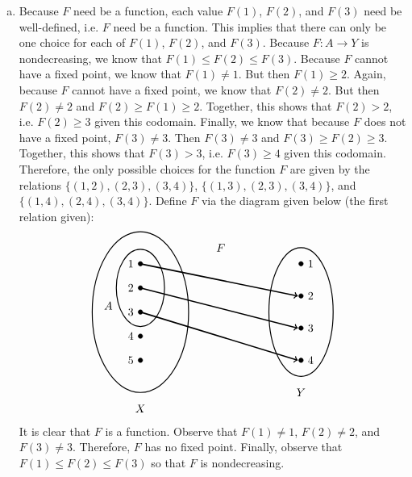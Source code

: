 \documentclass[11pt,letterpaper]{article}
\begin{document}
\sol 
\begin{enumerate}[(a)]
\item Because $F$ need be a function, each value $F(1)$, $F(2)$, and $F(3)$ need be well-defined, i.e. $F$ need be a function. This implies that there can only be one choice for each of $F(1)$, $F(2)$, and $F(3)$. Because $F \colon A \to Y$ is nondecreasing, we know that $F(1) \leq F(2) \leq F(3)$. Because $F$ cannot have a fixed point, we know that $F(1) \neq 1$. But then $F(1) \geq 2$. Again, because $F$ cannot have a fixed point, we know that $F(2) \neq 2$. But then $F(2) \neq 2$ and $F(2) \geq F(1) \geq 2$. Together, this shows that $F(2) > 2$, i.e. $F(2) \geq 3$ given this codomain. Finally, we know that because $F$ does not have a fixed point, $F(3) \neq 3$. Then $F(3) \neq 3$ and $F(3) \geq F(2) \geq 3$. Together, this shows that $F(3) > 3$, i.e. $F(3) \geq 4$ given this codomain. Therefore, the only possible choices for the function $F$ are given by the relations $\{ (1, 2), (2, 3), (3, 4) \}$, $\{ (1, 3), (2, 3), (3, 4) \}$, and $\{ (1, 4), (2, 4), (3, 4) \}$. Define $F$ via the diagram given below (the first relation given): 
	\[
	\begin{tikzpicture}
	\node at (2.5,2) {$F$};
	
	\draw[line width=0.03cm] (0,0) circle (1.5 and 2.5);
	\draw[line width=0.03cm] (0,0.75) circle (0.75 and 1.2);
	\draw[line width=0.03cm] (5,0) circle (1 and 2);
	
	\draw[fill=black] (0,1.5) circle (0.07);
	\draw[fill=black] (0,0.75) circle (0.07);
	\draw[fill=black] (0,0) circle (0.07);
	\draw[fill=black] (0,-0.75) circle (0.07);
	\draw[fill=black] (0,-1.5) circle (0.07);
	
	\draw[fill=black] (5,1.5) circle (0.07);
	\draw[fill=black] (5,0.50) circle (0.07);
	\draw[fill=black] (5,-0.5) circle (0.07);
	\draw[fill=black] (5,-1.5) circle (0.07);
	
	\draw[line width=0.04cm,->] (0,1.5) -- (4.9,0.50);
	\draw[line width=0.04cm,->] (0,0.75) -- (4.9,-0.5);
	\draw[line width=0.04cm,->] (0,0) -- (4.9,-1.5);

	\node at (-0.3,1.5) {$1$};
	\node at (-0.3,0.75) {$2$};
	\node at (-0.3,0) {$3$};
	\node at (-0.3,-0.75) {$4$};
	\node at (-0.3,-1.5) {$5$};
	
	\node at (5.3,1.5) {$1$};
	\node at (5.3,0.5) {$2$};
	\node at (5.3,-0.5) {$3$};
	\node at (5.3,-1.5) {$4$};
	
	\node at (0,-3) {$X$};
	\node at (-1,0.2) {$A$};
	\node at (5,-2.5) {$Y$};
	\end{tikzpicture}
	\]
It is clear that $F$ is a function. Observe that $F(1) \neq 1$, $F(2) \neq 2$, and $F(3) \neq 3$. Therefore, $F$ has no fixed point. Finally, observe that $F(1) \leq F(2) \leq F(3)$ so that $F$ is nondecreasing. \pspace


\end{enumerate}
\end{document}
